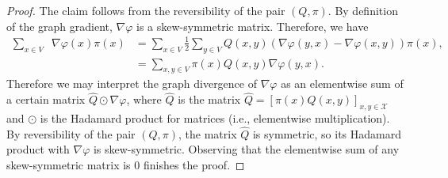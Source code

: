 \documentclass[10pt,a4paper]{amsart}
\newcommand{\X}{\mathcal{X}}
\DeclareMathOperator*{\divx}{div_{\X}}
\begin{document}
\begin{proof}
    The claim follows from the reversibility of the pair \((Q, \pi)\). By definition of the graph gradient, \(\nabla\varphi\) is a skew-symmetric matrix. Therefore, we have 
    \begin{align*}
        \sum\limits_{x\in V}\divx\nabla\varphi(x)\pi(x) &= \sum\limits_{x\in V}\frac{1}{2}\sum\limits_{y \in V}Q(x,y)(\nabla\varphi(y,x) - \nabla\varphi(x,y))\pi(x), \\
      &=\sum\limits_{x,y\in V}\pi(x)Q(x,y)\nabla\varphi(y,x). 
    \end{align*}
Therefore we may interpret the graph divergence of \(\nabla\varphi\) as an elementwise sum of a certain matrix \(\hat{Q}\odot \nabla\varphi\), where \(\hat{Q}\) is the matrix \(\hat{Q} = [\pi(x)Q(x,y)]_{x,y \in \X}\) and \(\odot\) is the Hadamard product for matrices (i.e., elementwise multiplication). By reversibility of the pair \((Q, \pi)\), the matrix \(\hat{Q}\) is symmetric, so its Hadamard product with \(\nabla\varphi\) is skew-symmetric. Observing that the elementwise sum of any skew-symmetric matrix is \(0\) finishes the proof. 
\end{proof}
\end{document}

